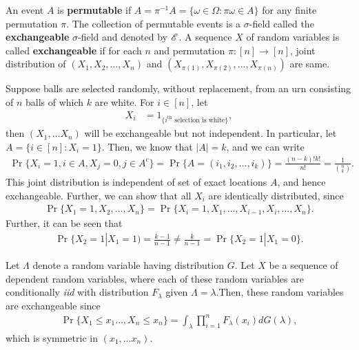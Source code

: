\documentclass[a4paper,10pt,english]{article}
\begin{document}
An event $A$ is \textbf{permutable} if $A = \pi^{-1}A = \{\omega \in \Omega: \pi \omega \in A\}$ for any finite permutation $\pi$.
The collection of permutable events is a $\sigma$-field called the \textbf{exchangeable} $\sigma$-field and denoted by $\mathscr{E}$.
A sequence $X$ of random variables is called \textbf{exchangeable} if for each $n$ and permutation $\pi: [n] \to [n]$, joint distribution of $(X_1, X_2, \ldots, X_n)$ and $(X_{\pi(1)}, X_{\pi(2)}, \ldots, X_{\pi(n)})$ are same.
\begin{exmp}
Suppose balls are selected randomly, without replacement, from an urn consisting of $n$ balls of which $k$ are white. For $i \in [n]$, let
\begin{align*}
   X_i &= 1_{\{ i^{\text{th}}\text{ selection is white}\}},
\end{align*}
then $(X_1, \ldots X_n)$ will be exchangeable but not independent.  
In particular, let $A = \{ i \in [n]: X_i = 1\}$. Then, we know that $|A| = k$, and we can write 
\begin{align*}
\Pr\{X_i = 1, i \in A, X_j = 0, j \in A^c\} = \Pr\{A = (i_1, i_2, \ldots, i_k) \} = \frac{(n-k)!k!}{n!} = \frac{1}{\binom{n}{k}}.
\end{align*}
This joint distribution is independent of set of exact locations $A$, and hence exchangeable. 
Further, we can show that all $X_i$ are identically distributed, since
\begin{align*}
\Pr\{X_1= 1, X_2, \ldots, X_n\} = \Pr\{X_i = 1, X_1, \ldots, X_{i-1}, X_i, \ldots, X_n\}. 
\end{align*}
Further, it can be seen that
\begin{align*}
\Pr\{X_2 = 1|X_1= 1) = \frac{k-1}{n-1} \neq \frac{k}{n-1} = \Pr\{X_2 = 1|X_1 =0\}.
\end{align*}
\end{exmp}
\begin{exmp}
Let $\Lambda$ denote a random variable having distribution $G$. Let $X$ be a sequence of dependent random variables, where each of these random variables are conditionally \textit{iid} with distribution $F_\lambda$ given $\Lambda= \lambda$.Then, these random variables are exchangeable since
\begin{align*}
\Pr\{X_1 \leq x_1 \ldots , X_n \leq x_n\} = \int_{\lambda} \prod_{i=1}^nF_\lambda(x_i)dG(\lambda),
\end{align*}
which is symmetric in $(x_1, \ldots x_n)$. %
\end{exmp}
\end{document}
